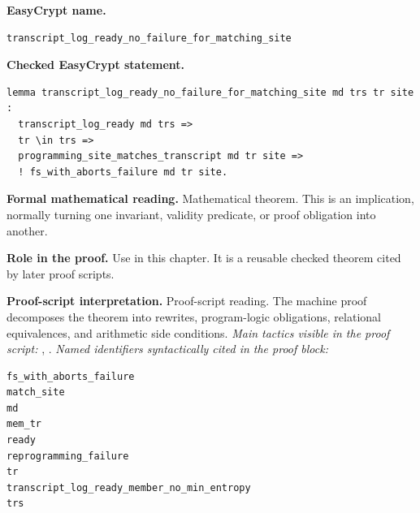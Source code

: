 \begin{formaltheorem}
\noindent\textbf{EasyCrypt name.}
\begin{lstlisting}[language=EasyCrypt,basicstyle=\ttfamily\scriptsize]
transcript_log_ready_no_failure_for_matching_site
\end{lstlisting}
\noindent\textbf{Checked EasyCrypt statement.}
\begin{lstlisting}[language=EasyCrypt,basicstyle=\ttfamily\scriptsize]
lemma transcript_log_ready_no_failure_for_matching_site md trs tr site :
  transcript_log_ready md trs =>
  tr \in trs =>
  programming_site_matches_transcript md tr site =>
  ! fs_with_aborts_failure md tr site.
\end{lstlisting}
\noindent\textbf{Formal mathematical reading.}
Mathematical theorem. This is an implication, normally turning one invariant, validity predicate, or proof obligation into another.

\noindent\textbf{Role in the proof.}
Use in this chapter. It is a reusable checked theorem cited by later proof scripts.

\noindent\textbf{Proof-script interpretation.}
Proof-script reading. The machine proof decomposes the theorem into rewrites, program-logic obligations, relational equivalences, and arithmetic side conditions.
\emph{Main tactics visible in the proof script:} , .
\emph{Named identifiers syntactically cited in the proof block:}
\begin{lstlisting}[language=EasyCrypt,basicstyle=\ttfamily\scriptsize]
fs_with_aborts_failure
match_site
md
mem_tr
ready
reprogramming_failure
tr
transcript_log_ready_member_no_min_entropy
trs
\end{lstlisting}

\end{formaltheorem}

